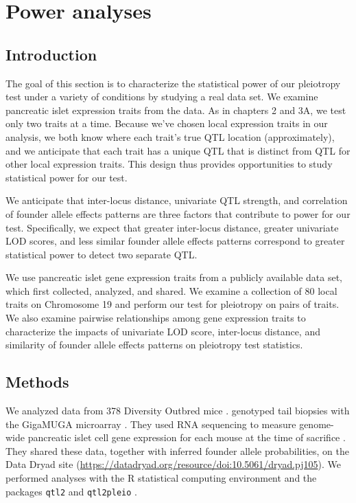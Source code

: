 \documentclass[oneside]{book}
\begin{document}
\section{Power analyses}

\subsection{Introduction}

The goal of this section is to characterize the statistical power of our pleiotropy test under a variety of conditions by studying a real data set. We examine pancreatic islet expression traits from the \citet{keller2018genetic} data. As in chapters 2 and 3A, we test only two traits at a time. Because we’ve chosen local expression traits in our analysis, we both know where each trait’s true QTL location (approximately), and we anticipate that each trait has a unique QTL that is distinct from QTL for other local expression traits. This design thus provides opportunities to study statistical power for our test.

We anticipate that inter-locus distance, univariate QTL strength, and correlation of founder allele effects patterns are three factors that contribute to power for our test. Specifically, we expect that greater inter-locus distance, greater univariate LOD scores, and less similar founder allele effects patterns correspond to greater statistical power to detect two separate QTL.

We use pancreatic islet gene expression traits from a publicly available data set, which \citet{keller2018genetic} first collected, analyzed, and shared. We examine a collection of 80 local traits on Chromosome 19 and perform our test for pleiotropy on pairs of traits. We also examine pairwise relationships among gene expression traits to characterize the impacts of univariate LOD score, inter-locus distance, and similarity of founder allele effects patterns on pleiotropy test statistics.



\subsection{Methods}


We analyzed data from 378 Diversity Outbred mice \citep{keller2018genetic}. \citet{keller2018genetic} genotyped tail biopsies with the GigaMUGA microarray \citep{morgan2016mouse}. They used RNA sequencing to measure genome-wide pancreatic islet cell gene expression for each mouse at the time of sacrifice \citep{keller2018genetic}. They shared these data, together with inferred founder allele probabilities, on the Data Dryad site (\url{https://datadryad.org/resource/doi:10.5061/dryad.pj105}). We performed analyses with the R statistical computing environment \citep{r} and the packages \texttt{qtl2} \citep{qtl2} and \texttt{qtl2pleio} \citep{qtl2pleio}.
\end{document}

